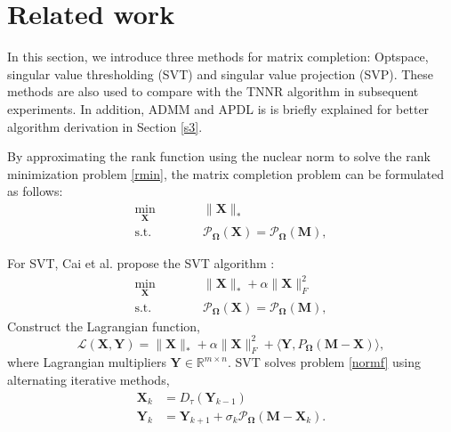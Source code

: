 \documentclass{article}
\begin{document}
{\section{Related work}
\label{s2}


In this section, we introduce three methods for matrix completion: Optspace\cite{keshavan.montanari200906}, singular value thresholding (SVT)\cite{cai.shen200810} and singular value projection (SVP)\cite{jain.dhillon2010}. These methods are also used to compare with the TNNR algorithm in subsequent experiments. In addition, ADMM and APDL is is briefly explained for better algorithm derivation in Section \ref{s3}.

By approximating the rank function using the nuclear norm to solve the rank
minimization problem \eqref{rmin},  the matrix completion problem can be formulated as follows:
\begin{equation}
    \begin{aligned}
        \min_{\mathbf X}\qquad&\quad \lVert\mathbf X\rVert_* \\
        \text{s.t.}\qquad&\quad  \mathcal{P}_{\mathbf \Omega}(\mathbf X) =  \mathcal{P}_{\mathbf\Omega}(\mathbf M),
    \end{aligned}
    \label{normf}
\end{equation}

For SVT, Cai et al. propose the SVT algorithm :
\begin{equation}
    \begin{aligned}
        \min_{\mathbf X}\qquad&\quad \lVert\mathbf X\rVert_* + \alpha\lVert \mathbf X\rVert_F^2\\
        \text{s.t.}\qquad&\quad\mathcal{P}_{\mathbf\Omega}(\mathbf X) =  \mathcal{P}_{\mathbf\Omega}(\mathbf M),
    \end{aligned}
\end{equation}
Construct the Lagrangian function,
\begin{equation}
    \mathcal{L}(\mathbf X,\mathbf Y) = \lVert\mathbf X\rVert_* + \alpha\lVert \mathbf X\rVert_F^2 + \langle \mathbf Y, P_{\mathbf\Omega}(\mathbf M-\mathbf X) \rangle,
\end{equation}
where Lagrangian multipliers $\mathbf Y \in \mathbb{R}^{m \times n}$. SVT solves problem \eqref{normf} using alternating iterative methods,
\begin{equation}
    \begin{aligned}
        \mathbf X_k & = D_\tau(\mathbf Y_{k-1})\\
        \mathbf Y_k & = \mathbf Y_{k+1} + \sigma_k\mathcal{P}_{\mathbf\Omega}(\mathbf M-\mathbf X_k).
    \end{aligned}
\end{equation}

}
\end{document}

